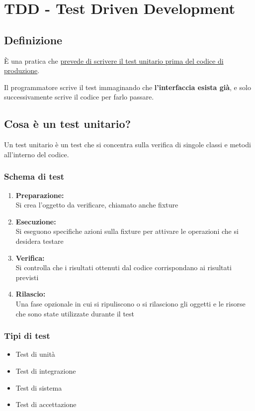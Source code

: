 \chapter{TDD - Test Driven Development}
\section{Definizione}
È una pratica che \uline{prevede di scrivere il test unitario prima del codice di produzione}.

Il programmatore scrive il test immaginando che \textbf{l'interfaccia esista già}, e solo successivamente scrive il codice per farlo passare.

\section{Cosa è un test unitario?}
Un test unitario è un test che si concentra sulla verifica di singole classi e metodi all'interno del codice.

\subsection{Schema di test}
\begin{enumerate}
    \item \textbf{Preparazione:}\\ Si crea l'oggetto da verificare, chiamato anche fixture
    \item \textbf{Esecuzione:}\\ Si eseguono specifiche azioni sulla fixture per attivare le operazioni che si desidera testare
    \item \textbf{Verifica:}\\ Si controlla che i risultati ottenuti dal codice corrispondano ai risultati previsti
    \item \textbf{Rilascio:}\\ Una fase opzionale in cui si ripuliscono o si rilasciono gli oggetti e le risorse che sono state utilizzate durante il test
\end{enumerate}

\subsection{Tipi di test}
\begin{itemize}
    \item Test di unità
    \item Test di integrazione
    \item Test di sistema
    \item Test di accettazione
\end{itemize}

